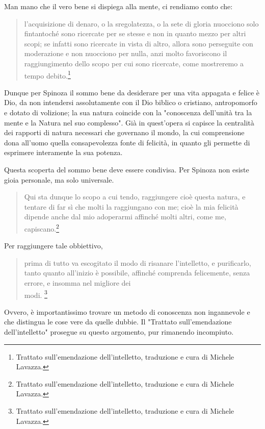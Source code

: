 Man mano che il vero bene si dispiega alla mente, ci rendiamo conto che:

\begin{quotation}
	\small l'acquisizione di denaro, o la sregolatezza, o la sete di gloria nuocciono solo
	fintantoché sono ricercate per se stesse e non in quanto mezzo per altri scopi; se infatti sono
	ricercate in vista di altro, allora sono perseguite con moderazione e non nuocciono per nulla, anzi
	molto favoriscono il raggiungimento dello scopo per cui sono ricercate, come mostreremo a tempo
	debito.\footnote{Trattato sull'emendazione dell'intelletto, traduzione e cura di Michele Lavazza.}
\end{quotation}

Dunque per Spinoza il sommo bene da desiderare per una vita appagata e felice è Dio, da non intendersi assolutamente con il Dio biblico o cristiano, antropomorfo e dotato di volizione; la sua natura coincide con la "conoscenza dell'unità tra la mente e la Natura nel suo complesso". Già in quest'opera si capisce la centralità dei rapporti di natura necessari che governano il mondo, la cui comprensione dona all'uomo quella consapevolezza fonte di felicità, in quanto gli permette di esprimere interamente la sua potenza.

Questa scoperta del sommo bene deve essere condivisa. Per Spinoza non esiste gioia personale, ma solo universale.

\begin{quotation}
	\small Qui sta dunque lo scopo a cui tendo, raggiungere cioè
	questa natura, e tentare di far sì che molti la raggiungano con me; cioè la mia felicità dipende anche
	dal mio adoperarmi affinché molti altri, come me, capiscano.\footnote{Trattato sull'emendazione dell'intelletto, traduzione e cura di Michele Lavazza.}
\end{quotation}

Per raggiungere tale obbiettivo,

\begin{quotation}
	\small  prima di tutto va escogitato il modo di
	risanare l'intelletto, e purificarlo, tanto quanto all'inizio è possibile, affinché comprenda felicemente,
	senza errore, e insomma nel migliore dei \\modi. \footnote{Trattato sull'emendazione dell'intelletto, traduzione e cura di Michele Lavazza.}
\end{quotation}

Ovvero, è importantissimo trovare un metodo di conoscenza non ingannevole e che distingua le cose vere da quelle dubbie. Il "Trattato sull'emendazione dell'intelletto" prosegue su questo argomento, pur rimanendo incompiuto.

